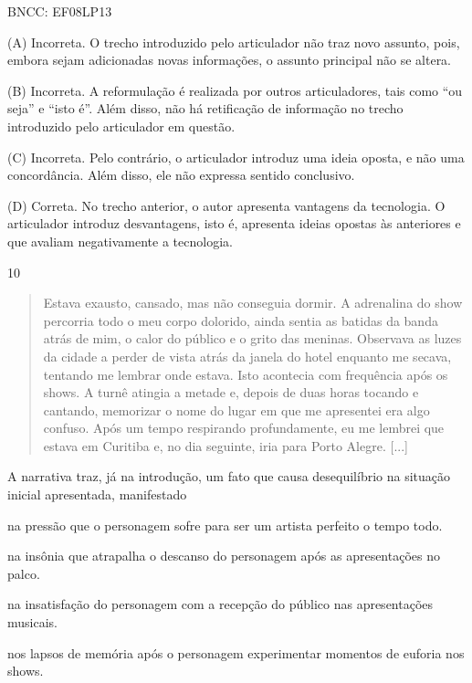 BNCC: EF08LP13

(A) Incorreta. O trecho introduzido pelo articulador não traz novo
assunto, pois, embora sejam adicionadas novas informações, o assunto
principal não se altera.

(B) Incorreta. A reformulação é realizada por outros articuladores, tais
como ``ou seja'' e ``isto é''. Além disso, não há retificação de
informação no trecho introduzido pelo articulador em questão.

(C) Incorreta. Pelo contrário, o articulador introduz uma ideia oposta,
e não uma concordância. Além disso, ele não expressa sentido conclusivo.

(D) Correta. No trecho anterior, o autor apresenta vantagens da
tecnologia. O articulador introduz desvantagens, isto é, apresenta
ideias opostas às anteriores e que avaliam negativamente a tecnologia.

\num{10}

\begin{quote}
Estava exausto, cansado, mas não conseguia dormir. A adrenalina do show
percorria todo o meu corpo dolorido, ainda sentia as batidas da banda
atrás de mim, o calor do público e o grito das meninas. Observava as
luzes da cidade a perder de vista atrás da janela do hotel enquanto me
secava, tentando me lembrar onde estava. Isto acontecia com frequência
após os shows. A turnê atingia a metade e, depois de duas horas tocando
e cantando, memorizar o nome do lugar em que me apresentei era algo
confuso. Após um tempo respirando profundamente, eu me lembrei que
estava em Curitiba e, no dia seguinte, iria para Porto Alegre. {[}...{]}
\end{quote}


A narrativa traz, já na introdução, um fato que causa desequilíbrio na
situação inicial apresentada, manifestado

\begin{escolha}
\item na pressão que o personagem sofre para ser um artista perfeito o
tempo todo.

\item na insônia que atrapalha o descanso do personagem após as
apresentações no palco.

\item na insatisfação do personagem com a recepção do público nas
apresentações musicais.

\item nos lapsos de memória após o personagem experimentar momentos de
euforia nos shows.
\end{escolha}

